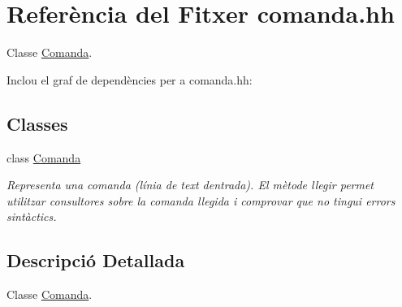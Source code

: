 \hypertarget{comanda_8hh}{}\section{Referència del Fitxer comanda.\+hh}
\label{comanda_8hh}


Classe \hyperlink{class_comanda}{Comanda}.  


Inclou el graf de dependències per a comanda.\+hh\+:
\subsection*{Classes}
\begin{DoxyCompactItemize}
\item 
class \hyperlink{class_comanda}{Comanda}
\begin{DoxyCompactList}\small\item\em Representa una comanda (línia de text d\textquotesingle{}entrada). El mètode llegir permet utilitzar consultores sobre la comanda llegida i comprovar que no tingui errors sintàctics. \end{DoxyCompactList}\end{DoxyCompactItemize}


\subsection{Descripció Detallada}
Classe \hyperlink{class_comanda}{Comanda}. 


